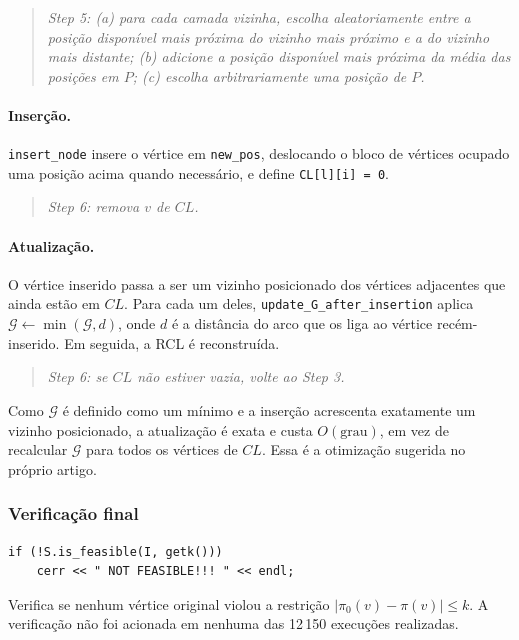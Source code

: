 \documentclass[12pt,a4paper]{article}
\newenvironment{artigo}
  {\begin{quote}\small\itshape}
  {\end{quote}}
\begin{document}
\begin{artigo}
Step 5: (a) para cada camada vizinha, escolha aleatoriamente entre a
posição disponível mais próxima do vizinho mais próximo e a do vizinho
mais distante; (b) adicione a posição disponível mais próxima da média das
posições em $P$; (c) escolha arbitrariamente uma posição de $P$.
\end{artigo}

\paragraph{Inserção.}
\texttt{insert\_node} insere o vértice em \texttt{new\_pos}, deslocando o
bloco de vértices ocupado uma posição acima quando necessário, e define
\texttt{CL[l][i] = 0}.

\begin{artigo}
Step 6: remova $v$ de $CL$.
\end{artigo}

\paragraph{Atualização.}
O vértice inserido passa a ser um vizinho posicionado dos vértices
adjacentes que ainda estão em $CL$. Para cada um deles,
\texttt{update\_G\_after\_insertion} aplica
$\mathcal{G} \leftarrow \min(\mathcal{G}, d)$, onde $d$ é a distância do
arco que os liga ao vértice recém-inserido. Em seguida, a RCL é
reconstruída.

\begin{artigo}
Step 6: se $CL$ não estiver vazia, volte ao Step 3.
\end{artigo}

Como $\mathcal{G}$ é definido como um mínimo e a inserção acrescenta
exatamente um vizinho posicionado, a atualização é exata e custa
$O(\text{grau})$, em vez de recalcular $\mathcal{G}$ para todos os
vértices de $CL$. Essa é a otimização sugerida no próprio artigo.

\subsubsection{Verificação final}

\begin{lstlisting}
if (!S.is_feasible(I, getk()))
    cerr << " NOT FEASIBLE!!! " << endl;
\end{lstlisting}

Verifica se nenhum vértice original violou a restrição
$|\pi_0(v) - \pi(v)| \le k$. A verificação não foi acionada em nenhuma das
12\,150 execuções realizadas.
\end{document}
